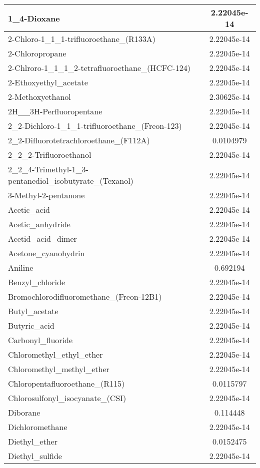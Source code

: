 \begin{longtable}{|l|c|}
1\_4-Dioxane 	& 2.22045e-14\\ \hline
2-Chloro-1\_1\_1-trifluoroethane\_(R133A) 	& 2.22045e-14\\ \hline
2-Chloropropane 	& 2.22045e-14\\ \hline
2-Chlroro-1\_1\_1\_2-tetrafluoroethane\_(HCFC-124) 	& 2.22045e-14\\ \hline
2-Ethoxyethyl\_acetate 	& 2.22045e-14\\ \hline
2-Methoxyethanol 	& 2.30625e-14\\ \hline
2H\_\_3H-Perfluoropentane 	& 2.22045e-14\\ \hline
2\_2-Dichloro-1\_1\_1-trifluoroethane\_(Freon-123) 	& 2.22045e-14\\ \hline
2\_2-Difluorotetrachloroethane\_(F112A) 	& 0.0104979\\ \hline
2\_2\_2-Trifluoroethanol 	& 2.22045e-14\\ \hline
2\_2\_4-Trimethyl-1\_3-pentanediol\_isobutyrate\_(Texanol) 	& 2.22045e-14\\ \hline
3-Methyl-2-pentanone 	& 2.22045e-14\\ \hline
Acetic\_acid 	& 2.22045e-14\\ \hline
Acetic\_anhydride 	& 2.22045e-14\\ \hline
Acetid\_acid\_dimer 	& 2.22045e-14\\ \hline
Acetone\_cyanohydrin 	& 2.22045e-14\\ \hline
Aniline 	& 0.692194\\ \hline
Benzyl\_chloride 	& 2.22045e-14\\ \hline
Bromochlorodifluoromethane\_(Freon-12B1) 	& 2.22045e-14\\ \hline
Butyl\_acetate 	& 2.22045e-14\\ \hline
Butyric\_acid 	& 2.22045e-14\\ \hline
Carbonyl\_fluoride 	& 2.22045e-14\\ \hline
Chloromethyl\_ethyl\_ether 	& 2.22045e-14\\ \hline
Chloromethyl\_methyl\_ether 	& 2.22045e-14\\ \hline
Chloropentafluoroethane\_(R115) 	& 0.0115797\\ \hline
Chlorosulfonyl\_isocyanate\_(CSI) 	& 2.22045e-14\\ \hline
Diborane 	& 0.114448\\ \hline
Dichloromethane 	& 2.22045e-14\\ \hline
Diethyl\_ether 	& 0.0152475\\ \hline
Diethyl\_sulfide 	& 2.22045e-14\\ \hline

\end{longtable}
